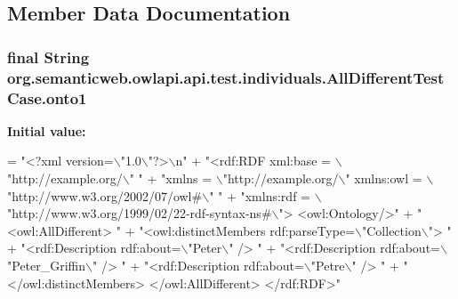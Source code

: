 \subsection{Member Data Documentation}
\hypertarget{classorg_1_1semanticweb_1_1owlapi_1_1api_1_1test_1_1individuals_1_1_all_different_test_case_a99f4811a4555058abbb5b5275e34a25c}{
\subsubsection[{onto1}]{\setlength{\rightskip}{0pt plus 5cm}final String org.\-semanticweb.\-owlapi.\-api.\-test.\-individuals.\-All\-Different\-Test\-Case.\-onto1\hspace{0.3cm}{\ttfamily [private]}}}\label{classorg_1_1semanticweb_1_1owlapi_1_1api_1_1test_1_1individuals_1_1_all_different_test_case_a99f4811a4555058abbb5b5275e34a25c}
{\bfseries Initial value\-:}
\begin{DoxyCode}
= \textcolor{stringliteral}{"<?xml version=\(\backslash\)"1.0\(\backslash\)"?>\(\backslash\)n"}
            + \textcolor{stringliteral}{"<rdf:RDF xml:base = \(\backslash\)"http://example.org/\(\backslash\)" "}
            + \textcolor{stringliteral}{"xmlns = \(\backslash\)"http://example.org/\(\backslash\)" xmlns:owl = \(\backslash\)"http://www.w3.org/2002/07/owl#\(\backslash\)" "}
            + \textcolor{stringliteral}{"xmlns:rdf = \(\backslash\)"http://www.w3.org/1999/02/22-rdf-syntax-ns#\(\backslash\)"> <owl:Ontology/>"}
            + \textcolor{stringliteral}{"<owl:AllDifferent> "}
            + \textcolor{stringliteral}{"<owl:distinctMembers rdf:parseType=\(\backslash\)"Collection\(\backslash\)"> "}
            + \textcolor{stringliteral}{"<rdf:Description rdf:about=\(\backslash\)"Peter\(\backslash\)" /> "}
            + \textcolor{stringliteral}{"<rdf:Description rdf:about=\(\backslash\)"Peter\_Griffin\(\backslash\)" /> "}
            + \textcolor{stringliteral}{"<rdf:Description rdf:about=\(\backslash\)"Petre\(\backslash\)" /> "}
            + \textcolor{stringliteral}{"</owl:distinctMembers> </owl:AllDifferent> </rdf:RDF>"}
\end{DoxyCode}
